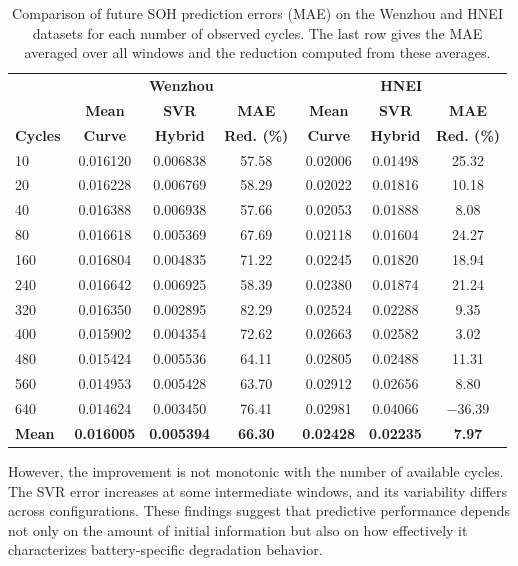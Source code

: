\documentclass[conference]{IEEEtran}
\begin{document}
\begin{table}[htbp]
    \centering
    \caption{Comparison of future SOH prediction errors (MAE) on the Wenzhou and HNEI datasets for each number of observed cycles. The last row gives the MAE averaged over all windows and the reduction computed from these averages.}
    \label{tab:wenzhou_mae_comparison}
    \footnotesize
    \setlength{\tabcolsep}{2pt}
    \begin{tabular}{lcccccc}
        \hline
         & \multicolumn{3}{c}{\textbf{Wenzhou}} & \multicolumn{3}{c}{\textbf{HNEI}} \\
        \textbf{} & \textbf{Mean} & \textbf{SVR} & \textbf{MAE} & \textbf{Mean} & \textbf{SVR} & \textbf{MAE} \\
        \textbf{Cycles} & \textbf{Curve} & \textbf{Hybrid} & \textbf{Red. (\%)} & \textbf{Curve} & \textbf{Hybrid} & \textbf{Red. (\%)} \\
        \hline
        10  & 0.016120 & 0.006838 & 57.58 & 0.02006 & 0.01498 & 25.32 \\
        20  & 0.016228 & 0.006769 & 58.29 & 0.02022 & 0.01816 & 10.18 \\
        40  & 0.016388 & 0.006938 & 57.66 & 0.02053 & 0.01888 & 8.08 \\
        80  & 0.016618 & 0.005369 & 67.69 & 0.02118 & 0.01604 & 24.27 \\
        160 & 0.016804 & 0.004835 & 71.22 & 0.02245 & 0.01820 & 18.94 \\
        240 & 0.016642 & 0.006925 & 58.39 & 0.02380 & 0.01874 & 21.24 \\
        320 & 0.016350 & 0.002895 & 82.29 & 0.02524 & 0.02288 & 9.35 \\
        400 & 0.015902 & 0.004354 & 72.62 & 0.02663 & 0.02582 & 3.02 \\
        480 & 0.015424 & 0.005536 & 64.11 & 0.02805 & 0.02488 & 11.31 \\
        560 & 0.014953 & 0.005428 & 63.70 & 0.02912 & 0.02656 & 8.80 \\
        640 & 0.014624 & 0.003450 & 76.41 & 0.02981 & 0.04066 & $-36.39$ \\
        \hline
        \textbf{Mean} & \textbf{0.016005} & \textbf{0.005394} & \textbf{66.30} & \textbf{0.02428} & \textbf{0.02235} & \textbf{7.97} \\
        \hline
    \end{tabular}
\end{table}

However, the improvement is not monotonic with the number of
available cycles. The SVR error increases at some intermediate
windows, and its variability differs across configurations.
These findings suggest that predictive performance depends not
only on the amount of initial information but also on how effectively
it characterizes battery-specific degradation behavior.
\end{document}
